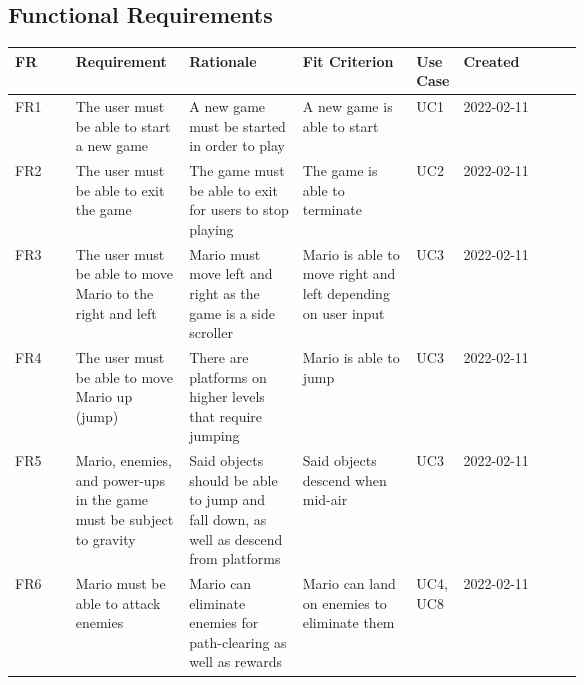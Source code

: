 \documentclass[12pt, titlepage]{article}
\begin{document}
\subsection{Functional Requirements}

\begin{longtable}{|l|p{0.2\linewidth}|p{0.2\linewidth}|p{0.2\linewidth}|p{0.06\linewidth}|l|}
\hline
\textbf{FR} & \textbf{Requirement}                                                 & \textbf{Rationale}                                                                   & \textbf{Fit Criterion}                                                                              & \textbf{Use Case} & \textbf{Created} \\ \hline
\endfirsthead
%
\endhead
%
FR1         & The user must be able to start a new game                            & A new game must be started in order to play                                          & A new game is able to start                                                                         & UC1               & 2022-02-11       \\ \hline
FR2         & The user must be able to exit the game                               & The game must be able to exit for users to stop playing                              & The game is able to terminate                                                                       & UC2               & 2022-02-11       \\ \hline
FR3         & The user must be able to move Mario to the right and left            & Mario must move left and right as the game is a side scroller                        & Mario is able to move right and left depending on user input                                        & UC3               & 2022-02-11       \\ \hline
FR4         & The user must be able to move Mario up (jump)                        & There are platforms on higher levels that require jumping                            & Mario is able to jump                                                                               & UC3               & 2022-02-11       \\ \hline
FR5         & Mario, enemies, and power-ups in the game must be subject to gravity & Said objects should be able to jump and fall down, as well as descend from platforms & Said objects descend when mid-air                                                                   & UC3               & 2022-02-11       \\ \hline
FR6         & Mario must be able to attack enemies                                 & Mario can eliminate enemies for path-clearing as well as rewards                     & Mario can land on enemies to eliminate them                                                         & UC4, UC8          & 2022-02-11       \\ \hline

\end{longtable}
\end{document}
